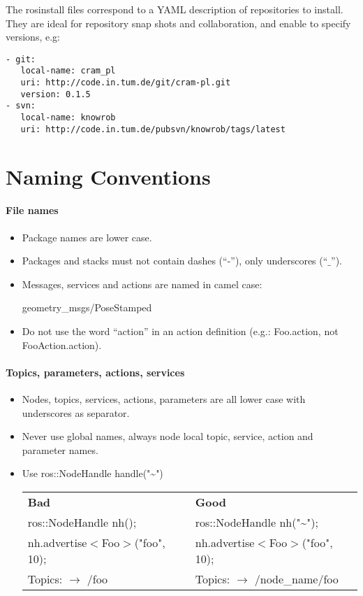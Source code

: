 The rosinstall files correspond to a YAML description of repositories to install.
They are ideal for repository snap shots and collaboration, and enable to specify versions, e.g:
\begin{verbatim}
- git:
   local-name: cram_pl
   uri: http://code.in.tum.de/git/cram-pl.git
   version: 0.1.5
- svn:
   local-name: knowrob
   uri: http://code.in.tum.de/pubsvn/knowrob/tags/latest
\end{verbatim}


\section{Naming Conventions}
\paragraph{File names}
\begin{itemize}
\item Package names are lower case.
\item Packages and stacks must not contain dashes (“-”), only underscores (“$\_$”).
\item Messages, services and actions are named in camel case:
\begin{tt}geometry\_msgs/PoseStamped \end{tt}
\item Do not use the word “action” in an action definition (e.g.: Foo.action, not FooAction.action).
\end{itemize}

\paragraph{Topics, parameters, actions, services}
\begin{itemize}[noitemsep]
\item Nodes, topics, services, actions, parameters are all lower case with underscores as separator.
\item Never use global names, always node local topic, service, action and parameter names. 
\item Use ros::NodeHandle handle("\textasciitilde")\\
\begin{tabular}{ll}
\textbf{Bad} & \textbf{Good}\\
ros::NodeHandle nh();         & ros::NodeHandle nh("\textasciitilde");\\
nh.advertise$<$Foo$>$("foo", 10); & nh.advertise$<$Foo$>$("foo", 10);\\
Topics: $\rightarrow$ /foo &
Topics: $\rightarrow$ /node\_name/foo
\end{tabular}
\end{itemize}


